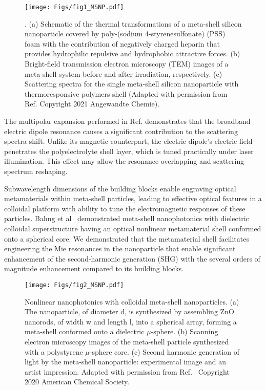 \documentclass[journal=chreay,manuscript=review]{achemso}
\begin{document}
\begin{figure}[h]
    \centering
    \texttt{[image: Figs/fig1\_MSNP.pdf]}
    \caption{. (a) Schematic of the thermal transformations of a meta-shell silicon nanoparticle covered by poly-(sodium 4-styrenesulfonate) (PSS) foam with the contribution of negatively charged heparin that provides hydrophilic repulsive and hydrophobic attractive forces. (b) Bright-field transmission electron microscopy (TEM) images of a meta-shell system before and after irradiation, respectively.  (c) Scattering spectra for the single meta-shell silicon nanoparticle with thermoresponsive polymers shell (Adapted with permission from Ref. Copyright 2021 Angewandte Chemie).}
    \label{fig:yuri1}
\end{figure}



The multipolar expansion performed in Ref. demonstrates that the broadband electric dipole resonance causes a significant contribution to the scattering spectra shift. Unlike its magnetic
counterpart, the electric dipole’s electric field penetrates the polyelectrolyte shell layer, which is tuned practically under laser illumination. This effect may allow the resonance overlapping and scattering spectrum reshaping.

Subwavelength dimensions of the building blocks enable engraving optical metamaterials within meta-shell particles,  leading to effective optical features in a colloidal platform with ability to tune the electromagnetic responses of these particles.  Bahng et al~\cite{bahng2020mie} demonstrated meta-shell nanophotonics with dielectric colloidal superstructure having an optical nonlinear metamaterial shell conformed onto a spherical core. We demonstrated that the metamaterial shell facilitates engineering the Mie resonances in the nanoparticle that enable significant enhancement of the second-harmonic generation (SHG) with the several orders of magnitude enhancement compared to its building blocks. 

\begin{figure}[h]
    \centering
    \texttt{[image: Figs/fig2\_MSNP.pdf]}
    \caption{Nonlinear nanophotonics with colloidal meta-shell nanoparticles. (a) The nanoparticle, of diameter d, is synthesized by assembling ZnO nanorods, of width w and length l, into a spherical array, forming a meta-shell conformed onto a dielectric $\mu$-sphere. (b) Scanning electron microscopy images of the meta-shell particle synthesized with a polystyrene $\mu$-sphere core. (c) Second harmonic generation of light by the meta-shell nanoparticle: experimental image and an artist impression. Adapted with permission from Ref.~ Copyright 2020 American Chemical Society.}
    \label{fig:yuri2}
\end{figure}
\end{document}
